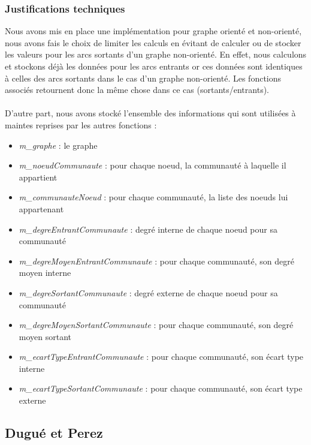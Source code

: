 \begin{titlepage}
{\subsubsection{Justifications techniques}
{
Nous avons mis en place une implémentation pour graphe orienté et non-orienté, nous avons fais le choix de limiter les calculs en évitant de calculer ou de stocker les valeurs pour les arcs sortants d'un graphe non-orienté. En effet, nous calculons et stockons déjà les données pour les arcs entrants or ces données sont identiques à celles des arcs sortants dans le cas d'un graphe non-orienté. Les fonctions associés retournent donc la même chose dans ce cas (sortants/entrants).
\\ \\
D'autre part, nous avons stocké l'ensemble des informations qui sont utilisées à maintes reprises par les autres fonctions :}
\begin{itemize}
    \item \textit{m\_graphe} : le graphe
    \item \textit{m\_noeudCommunaute} : pour chaque noeud, la communauté à laquelle il appartient
    \item \textit{m\_communauteNoeud} : pour chaque communauté, la liste des noeuds lui appartenant
    \item \textit{m\_degreEntrantCommunaute} : degré interne de chaque noeud pour sa communauté
    \item \textit{m\_degreMoyenEntrantCommunaute} : pour chaque communauté, son degré moyen interne
    \item \textit{m\_degreSortantCommunaute} : degré externe de chaque noeud pour sa communauté
    \item \textit{m\_degreMoyenSortantCommunaute} : pour chaque communauté, son degré moyen sortant
    \item \textit{m\_ecartTypeEntrantCommunaute} : pour chaque communauté, son écart type interne
    \item \textit{m\_ecartTypeSortantCommunaute} : pour chaque communauté, son écart type externe
\end{itemize}

\subsection{Dugué et Perez}
}
\end{titlepage}
